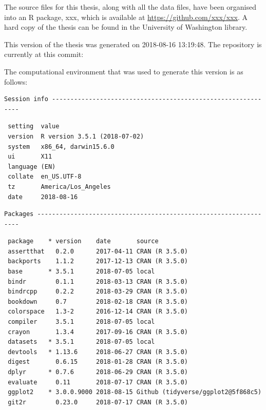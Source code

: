\documentclass[twoside,12pt,final]{ucthesis-CA2012}
\begin{document}
\begin{ucmainmatter}
The source files for this thesis, along with all the data files, have
been organised into an R package, xxx, which is available at
\url{https://github.com/xxx/xxx}. A hard copy of the thesis can be found
in the University of Washington library.

This version of the thesis was generated on 2018-08-16 13:19:48. The
repository is currently at this commit:

The computational environment that was used to generate this version is
as follows:
\begin{verbatim}
Session info -------------------------------------------------------------
\end{verbatim}
\begin{verbatim}
 setting  value                       
 version  R version 3.5.1 (2018-07-02)
 system   x86_64, darwin15.6.0        
 ui       X11                         
 language (EN)                        
 collate  en_US.UTF-8                 
 tz       America/Los_Angeles         
 date     2018-08-16                  
\end{verbatim}
\begin{verbatim}
Packages -----------------------------------------------------------------
\end{verbatim}
\begin{verbatim}
 package    * version    date       source                               
 assertthat   0.2.0      2017-04-11 CRAN (R 3.5.0)                       
 backports    1.1.2      2017-12-13 CRAN (R 3.5.0)                       
 base       * 3.5.1      2018-07-05 local                                
 bindr        0.1.1      2018-03-13 CRAN (R 3.5.0)                       
 bindrcpp     0.2.2      2018-03-29 CRAN (R 3.5.0)                       
 bookdown     0.7        2018-02-18 CRAN (R 3.5.0)                       
 colorspace   1.3-2      2016-12-14 CRAN (R 3.5.0)                       
 compiler     3.5.1      2018-07-05 local                                
 crayon       1.3.4      2017-09-16 CRAN (R 3.5.0)                       
 datasets   * 3.5.1      2018-07-05 local                                
 devtools   * 1.13.6     2018-06-27 CRAN (R 3.5.0)                       
 digest       0.6.15     2018-01-28 CRAN (R 3.5.0)                       
 dplyr      * 0.7.6      2018-06-29 CRAN (R 3.5.0)                       
 evaluate     0.11       2018-07-17 CRAN (R 3.5.0)                       
 ggplot2    * 3.0.0.9000 2018-08-15 Github (tidyverse/ggplot2@5f868c5)   
 git2r        0.23.0     2018-07-17 CRAN (R 3.5.0)                       

\end{verbatim}
\end{ucmainmatter}
\end{document}
